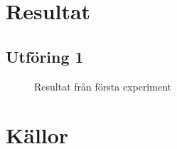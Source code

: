 \documentclass[a4paper,12pt]{article}
\begin{document}


\section{Resultat}

\subsection{Utföring 1}

	\begin{figure}[!htb]
		\caption{Resultat från första experiment}
		\label{fig:figure_1}
	\end{figure}


\section{Källor}

%


\end{document}
